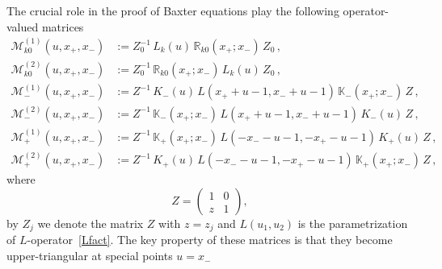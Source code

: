 \documentclass[a4paper,11pt]{article}
\numberwithin{equation}{section}
\begin{document}
The crucial role in the proof of Baxter equations play the following operator-valued matrices
\begin{align}
	\label{Mk01def}
	\mathcal{M}^{(1)}_{k0}(u,x_+,x_-) & :=
	Z_0^{-1}\,L_k(u)\,\mathbb{R}_{k0}(x_+;x_-)\,Z_0 \,, \\
	\label{Mk02def}
	\mathcal{M}^{(2)}_{k0}(u,x_+,x_-) & :=
	Z_0^{-1}\,\mathbb{R}_{k0}(x_+;x_-)\,L_k(u)\,Z_0 \,, \\
	\label{M-1def}
	\mathcal{M}^{(1)}_-(u,x_+,x_-) & :=
	Z^{-1}\,K_-(u)\,L(x_++u-1,x_-+u-1)\,\mathbb{K}_-(x_+;x_-)\,Z \,, \\
	\label{M-2def}
	\mathcal{M}^{(2)}_-(u,x_+,x_-) & :=
	Z^{-1}\,\mathbb{K}_-(x_+;x_-)\,L(x_++u-1,x_-+u-1)\,K_-(u)\,Z \,, \\
	\label{M+1def}
	\mathcal{M}^{(1)}_+(u,x_+,x_-) & := Z^{-1}\,\mathbb{K}_+(x_+;x_-)\,L(-x_--u-1,-x_+-u-1)\,K_+(u)\,Z \,, \\
	\label{M+2def}
	\mathcal{M}^{(2)}_+(u,x_+,x_-) & :=
	Z^{-1}\,K_+(u)\,L(-x_--u-1,-x_+-u-1)\,\mathbb{K}_+(x_+;x_-)\,Z \,,
\end{align}
where
\begin{equation} \nonumber
	Z =
	\begin{pmatrix}
		1 & 0 \\
		z & 1
	\end{pmatrix} ,
\end{equation}
by $Z_j$ we denote the matrix $Z$ with $z=z_j$ and
$L(u_1,u_2)$ is the parametrization of $L$-operator~\eqref{Lfact}.
The key property of these matrices is that they become upper-triangular at special points $u=x_-$
\end{document}
